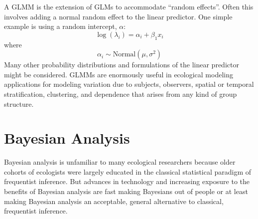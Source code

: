 A GLMM is the extension of GLMs to accommodate ``random
effects''. Often this involves adding a normal random effect to the
linear predictor. One simple example is using a random intercept, $\alpha$:
\[
 \log(\lambda_{i}) = \alpha_{i} + \beta_{1} x_{i}
\]
where
\[
 \alpha_{i} \sim \mbox{Normal}(\mu,\sigma^{2})
\]
Many other probability distributions and formulations of the linear
predictor might be considered.  GLMMs are enormously useful in
ecological modeling applications for modeling variation due to 
subjects, observers, spatial
or temporal stratification, clustering, and dependence that arises
from any kind of group structure.




\section{Bayesian Analysis}

Bayesian analysis is unfamiliar to many ecological researchers because
older cohorts of ecologists were largely educated in the classical
statistical paradigm of frequentist inference. But advances in
technology and increasing exposure to the benefits of Bayesian analysis
are fast making Bayesians out of people or at least making Bayesian
analysis an acceptable, general alternative to classical, frequentist
inference.

